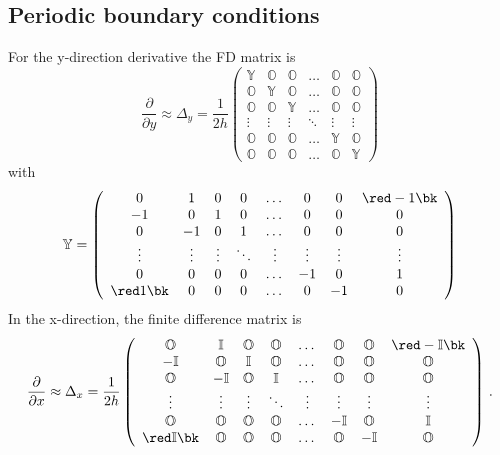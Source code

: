 \subsection*{Periodic boundary conditions}
For the y-direction derivative the FD matrix is
\begin{equation} \label{eq_FDmatrix_der1_y}
	\frac{\partial }{\partial y} \approx \Delta_y= \frac{1}{2h}\left(\begin{array}{cccccc}
		\mathbb{Y} & \mathbb{O} & \mathbb{O}& \dots&\mathbb{O} &\mathbb{O}\\
		\mathbb{O}&\mathbb{Y} &  \mathbb{O}& \dots&\mathbb{O}&\mathbb{O}\\
		\mathbb{O}&\mathbb{O}&\mathbb{Y} & \dots &  \mathbb{O}&\mathbb{O}\\
		\vdots&\vdots&\vdots&\ddots &\vdots&\vdots\\
		\mathbb{O}&\mathbb{O}&\mathbb{O}&\dots &\mathbb{Y} & \mathbb{O} \\
		\mathbb{O}&\mathbb{O}&\mathbb{O}&\dots &\mathbb{O}&\mathbb{Y}
	\end{array}\right)
\end{equation}
with
\begin{equation}
	\mathbb{Y} = \left(\begin{array}{cccccccc}
		0 & 1 & 0&  0 & \dots & 0 & 0 & \red -1 \bk\\
		-1 & 0 &  1& 0 & \dots& 0 & 0 & 0\\
		0 &-1&0 & 1 & \dots & 0 & 0 & 0\\
		\vdots&\vdots&\vdots&\ddots &\vdots&\vdots&\vdots&\vdots\\
		0 & 0 & 0 &0 &  \dots & -1 & 0 & 1 \\
		\red 1 \bk & 0 & 0 &0 &  \dots & 0 &-1 &0
	\end{array}\right)
\end{equation}
In the x-direction, the finite difference matrix is
\begin{equation}
	\frac{\partial }{\partial x} \approx \Delta_x = \frac{1}{2h}
	\left(\begin{array}{cccccccc}
		\mathbb{O} & \mathbb{I} & \mathbb{O}& \mathbb{O}&\dots &\mathbb{O} &  \mathbb{O} & \red -\mathbb{I} \bk \\
		-\mathbb{I}&\mathbb{O} &  \mathbb{I}& \mathbb{O}&\dots&\mathbb{O}&  \mathbb{O}&\mathbb{O}\\
		\mathbb{O}& -\mathbb{I}&\mathbb{O} & \mathbb{I}& \dots & \mathbb{O}&  \mathbb{O}&  \mathbb{O}\\
		\vdots&\vdots&\vdots&\ddots &\vdots&\vdots&\vdots&\vdots\\
		\mathbb{O}&\mathbb{O}&\mathbb{O}&\mathbb{O}&\dots & -\mathbb{I}&  \mathbb{O} & \mathbb{I} \\
		\red\mathbb{I} \bk&\mathbb{O}&\mathbb{O}&\mathbb{O}&\dots &\mathbb{O}& -\mathbb{I} &\mathbb{O}
	\end{array}\right) \,.
\end{equation}


